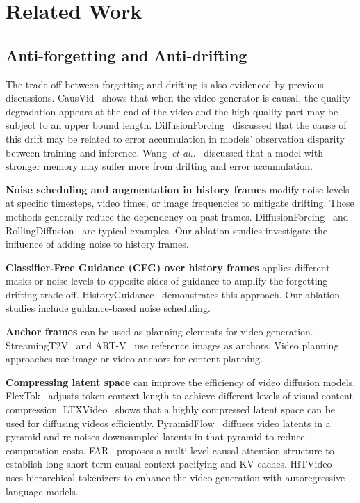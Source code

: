 \documentclass{article}
\makeatletter
\DeclareRobustCommand\onedot{\futurelet\@let@token\@onedot}
\def\@onedot{\ifx\@let@token.\else.\null\fi\xspace}
\def\etal{\emph{et al}\onedot}
\makeatother
\begin{document}
\section{Related Work}

\subsection{Anti-forgetting and Anti-drifting}

The trade-off between forgetting and drifting is also evidenced by previous discussions.
CausVid~\cite{yin2024slow} shows that when the video generator is causal, the quality degradation appears at the end of the video and the high-quality part may be subject to an upper bound length.
DiffusionForcing~\cite{chen2025diffusion} discussed that the cause of this drift may be related to error accumulation in models' observation disparity between training and inference.
Wang~\etal~\cite{wang2025erroranalysesautoregressivevideo} discussed that a model with stronger memory may suffer more from drifting and error accumulation.

\textbf{Noise scheduling and augmentation in history frames} modify noise levels at specific timesteps, video times, or image frequencies to mitigate drifting. These methods generally reduce the dependency on past frames. DiffusionForcing~\cite{chen2025diffusion} and RollingDiffusion~\cite{ruhe2024rolling} are typical examples. Our ablation studies investigate the influence of adding noise to history frames.

\textbf{Classifier-Free Guidance (CFG) over history frames} applies different masks or noise levels to opposite sides of guidance to amplify the forgetting-drifting trade-off. HistoryGuidance~\cite{song2025history} demonstrates this approach. Our ablation studies include guidance-based noise scheduling.

\textbf{Anchor frames} can be used as planning elements for video generation. StreamingT2V~\cite{henschel2024streamingt2v} and ART-V~\cite{park2021nerfies} use reference images as anchors. Video planning approaches \cite{long2024videostudiogeneratingconsistentcontentmultiscene,zhao2024moviedreamer,hu2024storyagent,xie2024dreamfactory,bansal2024talc,yang2024synchronized} use image or video anchors for content planning.

\textbf{Compressing latent space} can improve the efficiency of video diffusion models.
FlexTok~\cite{bachmann2025flextok} adjusts token context length to achieve different levels of visual content compression.
LTXVideo~\cite{hacohen2024ltx} shows that a highly compressed latent space can be used for diffusing videos efficiently.
PyramidFlow~\cite{jin2024pyramidal} diffuses video latents in a pyramid and re-noises downsampled latents in that pyramid to reduce computation costs.
FAR~\cite{gu2025longcontextautoregressivevideomodeling} proposes a multi-level causal attention structure to establish long-short-term causal context pacifying and KV caches.
HiTVideo~\cite{zhou2025hitvideo} uses hierarchical tokenizers to enhance the video generation with autoregressive language models.
\end{document}
